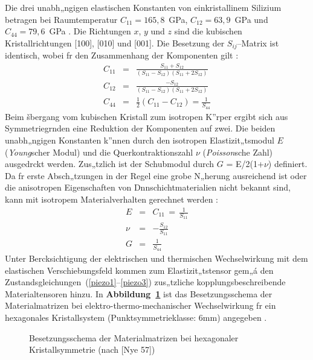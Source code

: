 Die drei unabh„ngigen elastischen Konstanten von einkristallinem
Silizium betragen bei Raumtemperatur $ C_{11} = 165,8$~GPa,
$C_{12} = 63,9$~GPa und $C_{44} = 79,6$~GPa \cite{LB82}.
Die Richtungen $x$, $y$ und $z$ sind die kubischen Kristallrichtungen
[100], [010] und [001].  Die Besetzung der $ S_{ij} $--Matrix
ist identisch, wobei fr den Zusammenhang der Komponenten gilt
\cite{Nye57}:
%
\begin{eqnarray}
C_{11} & = & \displaystyle \frac { S_{11}+S_{12} }
             {(S_{11}-S_{12}) (S_{11}+2S_{12})}
             \nonumber \\
C_{12} & = & \displaystyle \frac{-S_{12} }
             {(S_{11}-S_{12}) (S_{11}+2S_{12})} \\
C_{44}           & = & \frac{1}{2} (C_{11} - C_{12})
                  = \displaystyle \frac{1}{ S_{44} } \nonumber
\end{eqnarray}
%
Beim šbergang vom kubischen Kristall zum isotropen K”rper ergibt sich
aus Symmetriegrnden eine Reduktion der Komponenten auf zwei. Die beiden
unabh„ngigen Konstanten k”nnen durch den isotropen Elastizit„tsmodul $E$
({\sl Young}scher Modul) und die Querkontraktionszahl $\nu$
({\sl Poisson}sche Zahl) ausgedrckt werden. Zus„tzlich ist der Schubmodul
durch $G$ = E/2(1+$\nu$) definiert. Da fr erste Absch„tzungen in der Regel
eine grobe N„herung ausreichend ist oder die anisotropen Eigenschaften von
Dnnschichtmaterialien nicht bekannt sind, kann mit isotropem
Materialverhalten gerechnet werden \cite{Heu89}:
%
\begin{eqnarray}
 E   & = & C_{11} \, = \, \frac{1}{S_{11}} \nonumber \\
 \nu & = & - \frac{S_{12}}{S_{11}} \\
 G   & = & \frac{1}{S_{44}} \nonumber
\end{eqnarray}
%
Unter Bercksichtigung der elektrischen und thermischen Wechselwirkung
mit dem elastischen Verschiebungsfeld kommen zum Elastizit„tstensor gem„á
den Zustandsgleichungen~(\ref{piezo1}--\ref{piezo3})
zus„tzliche kopplungsbeschreibende Materialtensoren hinzu.
In {\bf Abbildung~\ref{abbmatrix6mm}} ist das Besetzungsschema der
Materialmatrizen bei elektro-thermo-mechanischer Wechselwirkung fr
ein hexagonales Kristallsystem (Punktsymmetrieklasse: 6mm) angegeben
\cite{Nye57}.
\begin{figure}[htb]
\begin{center}

\setabbzv
\end{center}
\caption{\label{abbmatrix6mm}
 Besetzungsschema der Materialmatrizen bei hexagonaler
 Kristallsymmetrie (nach [Nye 57])}
\end{figure}
